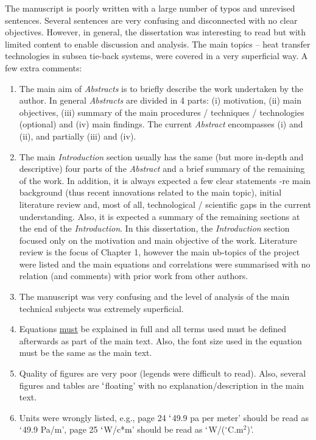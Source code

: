 \documentclass[14pt,twoside]{report}
\begin{document}
The manuscript is poorly written with a large number of typos and unrevised sentences. Several sentences are very confusing and disconnected with no clear objectives. However, in general, the dissertation was interesting to read but with limited content to enable discussion and analysis. The main topics -- heat transfer technologies in subsea tie-back systems,  were covered in a very superficial way. A few extra comments:
\begin{enumerate}
\item The main aim of {\it Abstracts} is to briefly describe the work undertaken by the author. In general {\it Abstracts} are divided in 4 parts: (i) motivation, (ii) main objectives, (iii) summary of the main procedures / techniques / technologies (optional) and (iv) main findings. The current {\it Abstract} encompasses (i) and (ii), and partially (iii) and (iv).
%
\item The main {\it Introduction} section usually has the same (but more in-depth and descriptive) four parts of the {\it Abstract} and a brief summary of the remaining of the work. In addition, it is always expected a few clear statements -re main background (thus recent innovations related to the main topic), initial literature review and, most of all, technological / scientific gaps in the current understanding. Also, it is expected a summary of the remaining sections at the end of the {\it Introduction}. In this dissertation, the {\it Introduction} section focused only on the motivation and main objective of the work. Literature review is the focus of Chapter 1, however the main ub-topics of the project were listed and the main equations and correlations were summarised with no relation (and comments) with prior work from other authors. 
%
\item The manuscript was very confusing and the level of analysis of the main technical subjects was extremely superficial. 
%
\item Equations \underline{must} be explained in full and all terms used must be defined afterwards as part of the main text. Also, the font size used in the equation must be the same as the main text.
%
\item Quality of figures are very poor (legends were difficult to read). Also, several figures and tables are $\lq$floating' with no explanation/description in the main text.
%
\item Units were wrongly listed, e.g., page 24 $\lq$49.9 pa per meter' should be read as $\lq$49.9 Pa/m', page 25 $\lq$W/c*m$\hat{ }$' should be read as $\lq$W/($^{\circ}$C.m$^{2}$)'.  

\end{enumerate}
\end{document}
